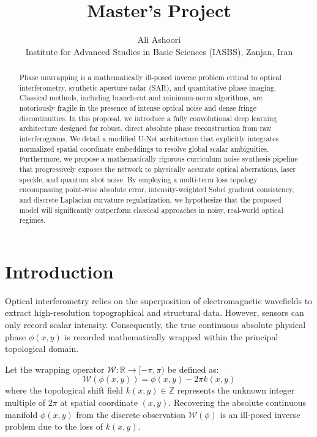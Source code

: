 \documentclass[11pt,onecolumn]{IEEEtran}
\begin{document}
\title{Master's Project}

\author{Ali Ashoori \\
Institute for Advanced Studies in Basic Sciences (IASBS), Zanjan, Iran}

\maketitle

\begin{abstract}
  Phase unwrapping is a mathematically ill-posed inverse problem critical to optical interferometry, synthetic aperture radar (SAR), and quantitative phase imaging. Classical methods, including branch-cut and minimum-norm algorithms, are notoriously fragile in the presence of intense optical noise and dense fringe discontinuities. In this proposal, we introduce a fully convolutional deep learning architecture designed for robust, direct absolute phase reconstruction from raw interferograms. We detail a modified U-Net architecture that explicitly integrates normalized spatial coordinate embeddings to resolve global scalar ambiguities. Furthermore, we propose a mathematically rigorous curriculum noise synthesis pipeline that progressively exposes the network to physically accurate optical aberrations, laser speckle, and quantum shot noise. By employing a multi-term loss topology encompassing point-wise absolute error, intensity-weighted Sobel gradient consistency, and discrete Laplacian curvature regularization, we hypothesize that the proposed model will significantly outperform classical approaches in noisy, real-world optical regimes.
\end{abstract}

\section{Introduction}
Optical interferometry relies on the superposition of electromagnetic wavefields to extract high-resolution topographical and structural data. However, sensors can only record scalar intensity. Consequently, the true continuous absolute physical phase $\phi(x,y)$ is recorded mathematically wrapped within the principal topological domain.

Let the wrapping operator $\mathcal{W}: \mathbb{R} \to [-\pi, \pi)$ be defined as:
\begin{equation}
  \mathcal{W}(\phi(x,y)) = \phi(x,y) - 2\pi k(x,y)
\end{equation}
where the topological shift field $k(x,y) \in \mathbb{Z}$ represents the unknown integer multiple of $2\pi$ at spatial coordinate $(x,y)$. Recovering the absolute continuous manifold $\phi(x,y)$ from the discrete observation $\mathcal{W}(\phi)$ is an ill-posed inverse problem due to the loss of $k(x,y)$.
\end{document}
